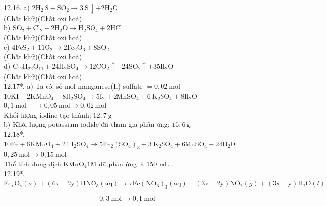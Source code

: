 \documentclass[10pt]{article}
\begin{document}
12.16. a) $2 \mathrm{H}_{2} \mathrm{~S}+\mathrm{SO}_{2} \rightarrow 3 \mathrm{~S} \downarrow+2 \mathrm{H}_{2} \mathrm{O}$\\
(Chất khử)(Chất oxi hoá)\\
b) $\mathrm{SO}_{2}+\mathrm{Cl}_{2}+2 \mathrm{H}_{2} \mathrm{O} \rightarrow \mathrm{H}_{2} \mathrm{SO}_{4}+2 \mathrm{HCl}$\\
(Chất khử)(Chất oxi hoá)\\
c) $4 \mathrm{FeS}_{2}+11 \mathrm{O}_{2} \rightarrow 2 \mathrm{Fe}_{2} \mathrm{O}_{3}+8 \mathrm{SO}_{2}$\\
(Chất khử)(Chất oxi hoá)\\
d) $\mathrm{C}_{12} \mathrm{H}_{22} \mathrm{O}_{11}+24 \mathrm{H}_{2} \mathrm{SO}_{4} \rightarrow 12 \mathrm{CO}_{2} \uparrow+24 \mathrm{SO}_{2} \uparrow+35 \mathrm{H}_{2} \mathrm{O}$\\
(Chất khử)(Chất oxi hoá)\\
12.17*. a) Ta có: số mol manganese(II) sulfate $=0,02 \mathrm{~mol}$\\
$10 \mathrm{KI}+2 \mathrm{KMnO}_{4}+8 \mathrm{H}_{2} \mathrm{SO}_{4} \rightarrow 5 \mathrm{I}_{2}+2 \mathrm{MnSO}_{4}+6 \mathrm{~K}_{2} \mathrm{SO}_{4}+8 \mathrm{H}_{2} \mathrm{O}$\\
$0,1 \mathrm{~mol} \quad \rightarrow 0,05 \mathrm{~mol} \rightarrow 0,02 \mathrm{~mol}$\\
Khối lượng iodine tạo thành: $12,7 \mathrm{~g}$\\
b) Khối lượng potassium iodide đã tham gia phản ứng: $15,6 \mathrm{~g}$.\\
12.18*. $10 \mathrm{Fe}+6 \mathrm{KMnO}_{4}+24 \mathrm{H}_{2} \mathrm{SO}_{4} \rightarrow 5 \mathrm{Fe}_{2}\left(\mathrm{SO}_{4}\right)_{3}+3 \mathrm{~K}_{2} \mathrm{SO}_{4}+6 \mathrm{MnSO}_{4}+24 \mathrm{H}_{2} \mathrm{O}$\\
$0,25 \mathrm{~mol} \rightarrow 0,15 \mathrm{~mol}$\\
Thể tích dung dịch $\mathrm{KMnO}_{4} 1 \mathrm{M}$ đã phản ứng là 150 mL .\\
12.19*.\\
$\mathrm{Fe}_{\mathrm{x}} \mathrm{O}_{\mathrm{y}}(s)+(6 \mathrm{x}-2 \mathrm{y}) \mathrm{HNO}_{3}(\mathrm{aq}) \rightarrow \mathrm{xFe}\left(\mathrm{NO}_{3}\right)_{3}(\mathrm{aq})+(3 \mathrm{x}-2 \mathrm{y}) \mathrm{NO}_{2}(g)+(3 \mathrm{x}-\mathrm{y}) \mathrm{H}_{2} \mathrm{O}(l)$

$$
0,3 \mathrm{~mol} \rightarrow 0,1 \mathrm{~mol}
$$
\end{document}
